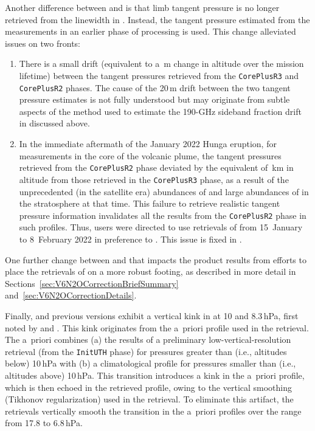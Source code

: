 Another difference between \prevv and \thisv is that limb tangent pressure is no longer retrieved from the  linewidth in \thisv. Instead, the tangent pressure estimated from the  measurements in an earlier phase of processing is used.  This change alleviated issues on two fronts:
\begin{enumerate}
  \item There is a small drift (equivalent to a \,m change in altitude over the mission lifetime) between the tangent pressures retrieved from the \texttt{CorePlusR3} and \texttt{CorePlusR2} phases. The cause of the 20\,m drift between the two tangent pressure estimates is not fully understood but may originate from subtle aspects of the method used to estimate the 190\nobreakdash-GHz sideband fraction drift in \prevv discussed above.
  \item In the immediate aftermath of the January 2022 Hunga eruption, for measurements in the core of the volcanic plume, the tangent pressures retrieved from the \texttt{CorePlusR2} phase deviated by the equivalent of \,km in altitude from those retrieved in the \texttt{CorePlusR3} phase, as a result of the unprecedented (in the satellite era) abundances of  and large abundances of  in the stratosphere at that time. This failure to retrieve realistic tangent pressure information invalidates all the results from the \texttt{CorePlusR2} phase in such profiles. Thus, users were directed to use \viv retrievals of  from 15~January to 8~February 2022 \citep{MillanEtal:2022} in preference to \vv.  This issue is fixed in \vvi.
\end{enumerate}
One further change between \prevv and \thisv that impacts the  product results from efforts to place the retrievals of  on a more robust footing, as described in more detail in Sections~\ref{sec:V6N2OCorrectionBriefSummary} and~\ref{sec:V6N2OCorrectionDetails}.

Finally, \vv and previous versions exhibit a vertical kink in  at 10 and 8.3\,hPa, first noted by \citet{NiemeierEtal:2023} and \citet{MillanEtal:2024}. This kink originates from the a~priori profile used in the retrieval.  The a~priori combines (a) the results of a preliminary low-vertical-resolution retrieval (from the \texttt{InitUTH} phase) for pressures greater than (i.e., altitudes below) 10\,hPa with (b) a climatological  profile for pressures smaller than (i.e., altitudes above) 10\,hPa.  This transition introduces a kink in the a~priori profile, which is then echoed in the retrieved profile, owing to the vertical smoothing (Tikhonov regularization) used in the retrieval. To eliminate this artifact, the \vvi retrievals vertically smooth the transition in the a~priori profiles over the range from 17.8 to 6.8\,hPa.

